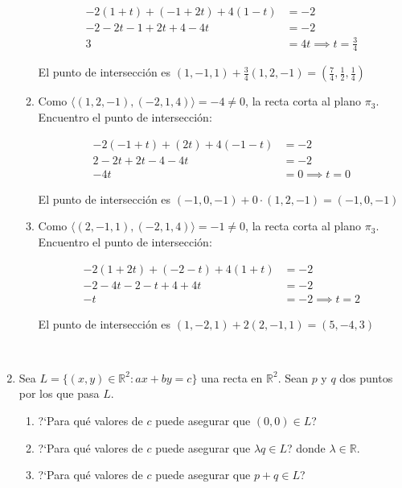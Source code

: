 \documentclass[a4paper,12pt,twoside,spanish,reqno]{amsbook}
\numberwithin{equation}{section}
\begin{document}
\begin{enumerate}[resume]
\begin{enumerate}
\begin{equation*}
\begin{array}{rl}
-2 (1+t) + (-1+2t) + 4 (1-t) &= -2 \\
-2 -2t -1 +2t +4 -4t  &= -2 \\
3 &= 4t \implies \boxed{t=\frac{3}{4}}
\end{array}
\end{equation*}

El punto de intersección es $(1,-1,1) + \frac{3}{4} (1,2,-1) = \boxed{ \left( \frac{7}{4} , \frac{1}{2} , \frac{1}{4} \right) }$

\item Como $\langle (1,2,-1),(-2,1,4) \rangle = -4 \neq 0 $, la recta corta al plano $\pi_3$. Encuentro el punto de intersección:

\begin{equation*}
\begin{array}{rl}
-2 (-1+t) + (2t) + 4 (-1-t) &= -2 \\
2-2t+2t-4-4t &= -2 \\
-4t &= 0 \implies \boxed{t=0}
\end{array}
\end{equation*}

El punto de intersección es $(-1,0,-1) + 0 \cdot (1,2,-1) = \boxed{ (-1,0,-1) }$

\item Como $\langle (2,-1,1),(-2,1,4) \rangle  = -1 \neq 0 $, la recta corta al plano $\pi_3$. Encuentro el punto de intersección:

\begin{equation*}
\begin{array}{rl}
-2 (1+2t) + (-2-t) + 4 (1+t) &= -2 \\
-2-4t-2-t+4 + 4t &= -2 \\
-t &= -2 \implies \boxed{t=2}
\end{array}
\end{equation*}

El punto de intersección es $(1,-2,1) + 2 (2,-1,1) = \boxed{ ( 5,-4,3 ) }$

\end{enumerate}

\

\item\label{rectas como subespacio} Sea $L=\{(x,y)\in\mathbb{R}^2 : ax+by=c\}$ una recta en $\mathbb{R}^2$. Sean $p$ y $q$ dos puntos por los que pasa $L$.
\begin{enumerate}
 \item ?`Para qu\'e valores de $c$ puede asegurar que $(0,0)\in L$?
 \item ?`Para qu\'e valores de $c$ puede asegurar que $\lambda q\in L$? donde $\lambda\in\mathbb{R}$.
 \item ?`Para qu\'e valores de $c$ puede asegurar que $p+q\in L$?
\end{enumerate}


\end{enumerate}
\end{document}
